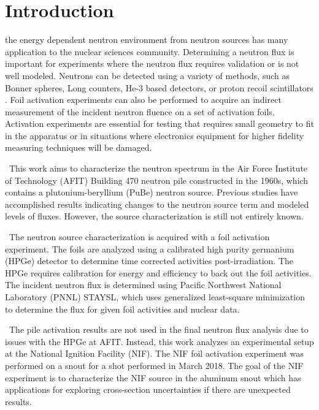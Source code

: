 \documentclass[journal]{IEEEtran}
\begin{document}
	\IEEEpeerreviewmaketitle
	
	\section{Introduction}
	 the energy dependent neutron environment from neutron sources has many application to the nuclear sciences community. Determining a neutron flux is important for experiments where the neutron flux requires validation or is not well modeled. Neutrons can be detected using a variety of methods, such as Bonner spheres, Long counters, He-3 based detectors, or proton recoil scintillators \cite{Knoll}. Foil activation experiments can also be performed to acquire an indirect measurement of the incident neutron fluence on a set of activation foils. Activation experiments are essential for testing that requires small geometry to fit in the apparatus or in situations where electronics equipment for higher fidelity measuring techniques will be damaged. 
	
	\ This work aims to characterize the neutron spectrum in the Air Force Institute of Technology (AFIT) Building 470 neutron pile constructed in the 1960s, which contains a plutonium-beryllium (PuBe) neutron source\cite{NETF}. Previous studies have accomplished results indicating changes to the neutron source term and modeled levels of fluxes\cite{Bevins,Will}. However, the source characterization is still not entirely known. 
	
	\ The neutron source characterization is acquired with a foil activation experiment. The foils are analyzed using a calibrated high purity germanium (HPGe) detector to determine time corrected activities post-irradiation. The HPGe requires calibration for energy and efficiency to back out the foil activities. The incident neutron flux is determined using Pacific Northwest National Laboratory (PNNL) STAYSL, which uses generalized least-square minimization to determine the flux for given foil activities and nuclear data.
	
	\ The pile activation results are not used in the final neutron flux analysis due to issues with the HPGe at AFIT. Instead, this work analyzes an experimental setup at the National Ignition Facility (NIF). The NIF foil activation experiment was performed on a snout for a shot performed in March 2018\cite{Bogetic}. The goal of the NIF experiment is to characterize the NIF source in the aluminum snout which has applications for exploring  cross-section uncertainties if there are unexpected results. 
\end{document}
